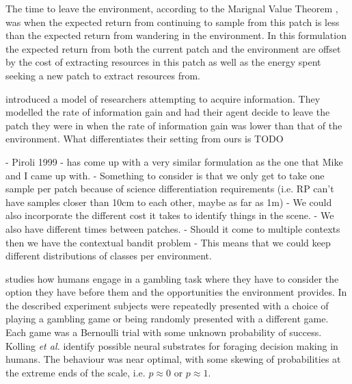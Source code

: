 The time to leave the environment, according to the Marignal Value Theorem
\cite{charnov1973optimal}, was when the expected return from continuing to
sample from this patch is less than the expected return from wandering in the
environment.  In this formulation the expected return from both the current
patch and the environment are offset by the cost of extracting resources in
this patch as well as the energy spent seeking a new patch to extract resources
from.

 


\cite{pirolli1999information} introduced a model of researchers attempting to
acquire information.  They modelled the rate of information gain and had their
agent decide to leave the patch they were in when the rate of information gain
was lower than that of the environment.  What differentiates their setting from
ours is TODO

	- Piroli 1999 - has come up with a very similar formulation as the one that 
		Mike and I came up with.
		- Something to consider is that we only get to take one sample per patch 
			because of science differentiation requirements (i.e. RP can't have 
			samples closer than 10cm to each other, maybe as far as 1m)
		- We could also incorporate the different cost it takes to identify things 
			in the scene.
		- We also have different times between patches.
		- Should it come to multiple contexts then we have the contextual bandit 
			problem
				- This means that we could keep different distributions of classes per 
					environment.

\cite{kolling2012neural} studies how humans engage in a gambling task where
they have to consider the option they have before them and the opportunities
the environment provides.  In the described experiment subjects were repeatedly
presented with a choice of playing a gambling game or being randomly presented
with a different game.  Each game was a Bernoulli trial with some unknown
probability of success.  Kolling \emph{et al.} identify possible neural
substrates for foraging decision making in humans.  The behaviour was near
optimal, with some skewing of probabilities at the extreme ends of the scale,
i.e. $p \approx 0$ or $p \approx 1$.


